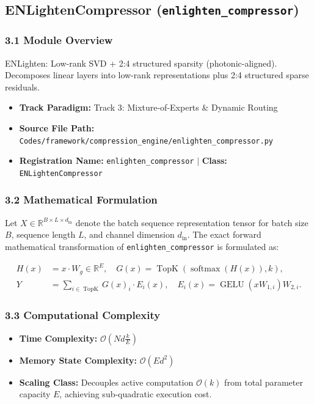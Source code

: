 \subsection{ENLightenCompressor (\texttt{enlighten\_compressor})}
\label{sec:app_module_enlighten_compressor}

\subsubsection*{3.1 Module Overview}
ENLighten: Low-rank SVD + 2:4 structured sparsity (photonic-aligned). Decomposes linear layers into low-rank representations plus 2:4 structured sparse residuals.
\begin{itemize}
    \item \textbf{Track Paradigm:} Track 3: Mixture-of-Experts & Dynamic Routing
    \item \textbf{Source File Path:} \texttt{Codes/framework/compression\_engine/enlighten\_compressor.py}
    \item \textbf{Registration Name:} \texttt{enlighten\_compressor} $\mid$ \textbf{Class:} \texttt{ENLightenCompressor}
\end{itemize}

\subsubsection*{3.2 Mathematical Formulation}
Let $X \in \mathbb{R}^{B \times L \times d_{\text{in}}}$ denote the batch sequence representation tensor for batch size $B$, sequence length $L$, and channel dimension $d_{\text{in}}$. The exact forward mathematical transformation of \texttt{enlighten\_compressor} is formulated as:

\begin{align}
H(x) &= x \cdot W_g \in \mathbb{R}^{E}, \quad G(x) = \operatorname{TopK}\left(\operatorname{softmax}(H(x)), k\right), \\
Y &= \sum_{i \in \operatorname{TopK}} G(x)_i \cdot E_i(x), \quad E_i(x) = \operatorname{GELU}(x W_{1, i}) W_{2, i}.
\end{align}


\subsubsection*{3.3 Computational Complexity}
\begin{itemize}
    \item \textbf{Time Complexity:} $\mathcal{O}(N d \frac{k}{E})$
    \item \textbf{Memory State Complexity:} $\mathcal{O}(E d^2)$
    \item \textbf{Scaling Class:} Decouples active computation $\mathcal{O}(k)$ from total parameter capacity $E$, achieving sub-quadratic execution cost.
\end{itemize}

